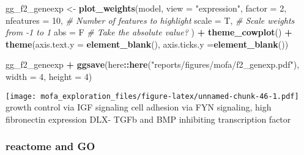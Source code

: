 \documentclass[
]{article}
\newenvironment{Shaded}{\begin{snugshade}}{\end{snugshade}}
\newcommand{\CommentTok}[1]{\textcolor[rgb]{0.56,0.35,0.01}{\textit{#1}}}
\newcommand{\DataTypeTok}[1]{\textcolor[rgb]{0.13,0.29,0.53}{#1}}
\newcommand{\DecValTok}[1]{\textcolor[rgb]{0.00,0.00,0.81}{#1}}
\newcommand{\KeywordTok}[1]{\textcolor[rgb]{0.13,0.29,0.53}{\textbf{#1}}}
\newcommand{\NormalTok}[1]{#1}
\newcommand{\OperatorTok}[1]{\textcolor[rgb]{0.81,0.36,0.00}{\textbf{#1}}}
\newcommand{\StringTok}[1]{\textcolor[rgb]{0.31,0.60,0.02}{#1}}
\begin{document}
\begin{Shaded}
\begin{Highlighting}[]
\NormalTok{gg_f2_geneexp <-}\StringTok{ }\KeywordTok{plot_weights}\NormalTok{(model,}
  \DataTypeTok{view =} \StringTok{"expression"}\NormalTok{,}
  \DataTypeTok{factor =} \DecValTok{2}\NormalTok{,}
  \DataTypeTok{nfeatures =} \DecValTok{10}\NormalTok{,     }\CommentTok{# Number of features to highlight}
  \DataTypeTok{scale =}\NormalTok{ T,          }\CommentTok{# Scale weights from -1 to 1}
  \DataTypeTok{abs =}\NormalTok{ F             }\CommentTok{# Take the absolute value?}
\NormalTok{) }\OperatorTok{+}\StringTok{ }
\StringTok{  }\KeywordTok{theme_cowplot}\NormalTok{() }\OperatorTok{+}\StringTok{ }
\StringTok{  }\KeywordTok{theme}\NormalTok{(}\DataTypeTok{axis.text.y =} \KeywordTok{element_blank}\NormalTok{(),}
        \DataTypeTok{axis.ticks.y =}\KeywordTok{element_blank}\NormalTok{()) }

\NormalTok{gg_f2_geneexp }\OperatorTok{+}\StringTok{ }
\StringTok{  }\KeywordTok{ggsave}\NormalTok{(here}\OperatorTok{::}\KeywordTok{here}\NormalTok{(}\StringTok{"reports/figures/mofa/f2_genexp.pdf"}\NormalTok{), }\DataTypeTok{width =} \DecValTok{4}\NormalTok{, }\DataTypeTok{height =} \DecValTok{4}\NormalTok{)}
\end{Highlighting}
\end{Shaded}

\texttt{[image: mofa\_exploration\_files/figure-latex/unnamed-chunk-46-1.pdf]}
growth control via IGF signaling cell adhesion via FYN signaling, high
fibronectin expression DLX- TGFb and BMP inhibiting transcription factor

\hypertarget{reactome-and-go}{%
\subsubsection{reactome and GO}\label{reactome-and-go}}
\end{document}
